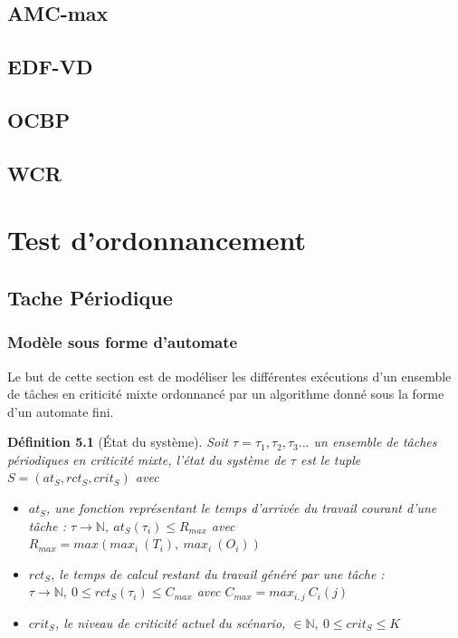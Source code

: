 \documentclass[a4paper]{report}
\theoremstyle{break}
\newtheorem{defin}{Définition}
\theoremstyle{breakplain}
\begin{document}
\section{AMC-max}
\section{EDF-VD}
\section{OCBP}
\section{WCR}


\chapter{Test d'ordonnancement}
\section{Tache Périodique}
\subsection{Modèle sous forme d'automate}

Le but de cette section est de modéliser les différentes exécutions d'un ensemble de tâches en criticité mixte ordonnancé par un algorithme donné sous la forme d'un automate fini.\\

\begin{defin}[État du système]
Soit $\tau = \tau_1, \tau_2, \tau_3 ...$ un ensemble de tâches périodiques en criticité mixte, l'état du système de $\tau$ est le tuple $S = (at_S, rct_S, crit_S)$ avec

\begin{itemize}
\item $at_S$, une fonction représentant le temps d'arrivée du travail courant d'une tâche : $\tau \rightarrow \mathbb{N},\ at_S(\tau_i) \leq R_{max}$ avec $R_{max} = max(max_i\ (T_i),\ max_i\ (O_i))$
\item $rct_S$, le temps de calcul restant du travail généré par une tâche : $ \tau \rightarrow \mathbb{N},\ 0 \leq rct_S(\tau_i) \leq C_{max}$ avec $C_{max} = max_{i,j}\ C_i(j)$
\item $crit_S$, le niveau de criticité actuel du scénario, $ \in \mathbb{N},\ 0 \leq crit_S \leq K$

\end{itemize}

\end{defin}
\end{document}
